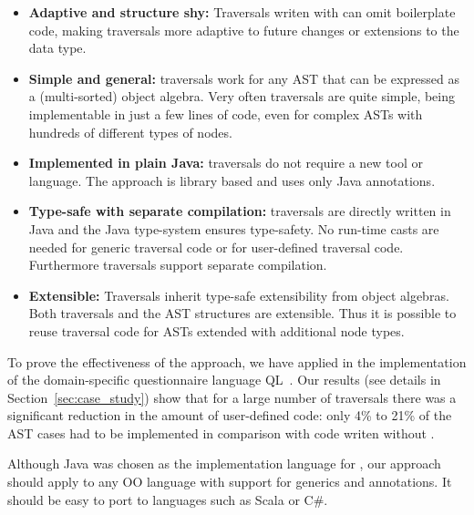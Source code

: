 \begin{itemize}

\item {\bf Adaptive and structure shy:}  Traversals writen with \name can omit
  boilerplate code, making traversals more adaptive to
  future changes or extensions to the data type.

\item {\bf Simple and general:} \name traversals work for any
  AST that can be expressed as a (multi-sorted) object
  algebra. Very often traversals are quite simple, being
  implementable in just a few lines of code, even for complex
  ASTs with hundreds of different types of nodes.

\item {\bf Implemented in plain Java:} \name traversals do not require
  a new tool or language. The approach is library based and uses only
  Java annotations.

\item {\bf Type-safe with separate compilation:} \name traversals are directly written in Java
  and the Java type-system ensures type-safety. No run-time casts are
  needed for generic traversal code or for user-defined traversal
  code. Furthermore \name traversals support separate compilation.

\item {\bf Extensible:} Traversals inherit type-safe
  extensibility from object algebras. Both traversals and the AST structures
  are extensible. Thus it is possible to
  reuse traversal code for ASTs extended with additional
  node types.


\end{itemize}

To prove the effectiveness of the approach, we have applied \name in
the implementation of the domain-specific questionnaire language
QL~\cite{gouseti14extensible}.  Our results (see details in
Section~\ref{sec:case_study}) show that for a large number of traversals there was a
significant reduction in the amount of user-defined code: only 4\% to
21\% of the AST cases had to be implemented in comparison with code
writen without \name.

Although Java was chosen as the implementation language for \Name,
our approach should apply to any OO language with support for generics
and annotations. It should be easy to port \name to
languages such as Scala or C\#.

